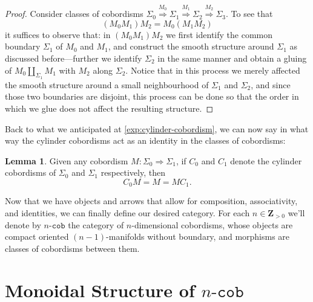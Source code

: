 \documentclass[11pt, reqno]{amsart}
\theoremstyle{definition}
\newtheorem{lemma}[theorem]{Lemma}
\newcommand{\disj}{\amalg}     %
\newcommand{\nat}{\Rightarrow}
\newcommand{\Z}{\mathbf{Z}}
\newcommand{\catfont}{\texttt}
\newcommand{\Cob}[1]{{#1}\text{-}{\catfont{cob}}} %
\begin{document}
\begin{proof}
Consider classes of cobordisms
\(\Sigma_0 \overset{M_0}\Longrightarrow \Sigma_1 \overset{M_1}\Longrightarrow
\Sigma_2 \overset{M_2} \Longrightarrow \Sigma_3\). To see that
\[
(M_0 M_1) M_2 = M_0 (M_1 M_2)
\]
it suffices to observe that: in \((M_0 M_1) M_2\) we first identify the common
boundary \(\Sigma_1\) of \(M_0\) and \(M_1\), and construct the smooth structure
around \(\Sigma_1\) as discussed before---further we identify \(\Sigma_2\) in
the same manner and obtain a gluing of \(M_0 \disj_{\Sigma_1} M_1\) with \(M_2\)
along \(\Sigma_2\). Notice that in this process we merely affected the smooth
structure around a small neighbourhood of \(\Sigma_1\) and \(\Sigma_2\), and
since those two boundaries are disjoint, this process can be done so that the
order in which we glue does not affect the resulting structure.
\end{proof}

Back to what we anticipated at \cref{exp:cylinder-cobordism}, we can now say in
what way the cylinder cobordisms act as an identity in the classes of
cobordisms:

\begin{lemma}
\label{lem:cylinder-cobordism-is-identity}
Given any cobordism \(M: \Sigma_0 \nat \Sigma_1\), if \(C_0\) and \(C_1\) denote
the cylinder cobordisms of \(\Sigma_0\) and \(\Sigma_1\) respectively, then
\[
C_0 M = M = M C_1.
\]
\end{lemma}

Now that we have objects and arrows that allow for composition, associativity,
and identities, we can finally define our desired category. For each
\(n \in \Z_{>0}\) we'll denote by \(\Cob{n}\) the category of \(n\)-dimensional
cobordisms, whose objects are compact oriented \((n-1)\)-manifolds without
boundary, and morphisms are classes of cobordisms between them.

\section{Monoidal Structure of \texorpdfstring{\(\Cob{n}\)}{n-cob}}
\end{document}
